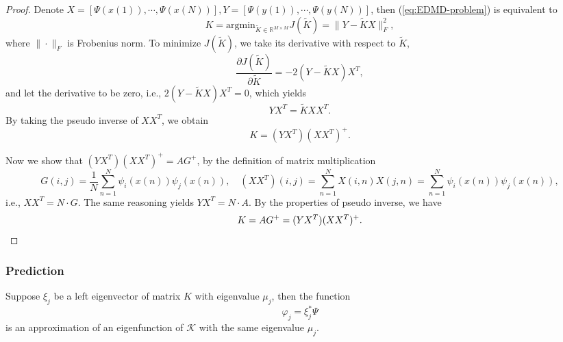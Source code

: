 \documentclass[en, bibend=bibtex]{elegantpaper}
\theoremstyle{plain}
\begin{document}
\begin{proof}
  Denote $X = [\Psi(x(1)),\cdots,\Psi(x(N))], Y =
  [\Psi(y(1)),\cdots,\Psi(y(N))]$,
  then (\ref{eq:EDMD-problem}) is equivalent to
  \begin{equation*}
    K = \text{argmin}_{\tilde{K} \in \mathbb{R}^{M \times M}} J(\tilde{K})
    = \|Y - \tilde{K}X\|_F^2,
  \end{equation*}
  where $\|\cdot\|_F$ is Frobenius norm.
  To minimize $J(\tilde{K})$, we take its derivative with respect to $\tilde{K}$,
  \begin{equation*}
    \frac{\partial J(\tilde{K})}{\partial \tilde{K}}
    = - 2(Y - \tilde{K}X)X^T,
  \end{equation*}
  and let the derivative to be zero, i.e.,
  $2(Y-\tilde{K}X)X^T = 0$,
  which yields
  \begin{equation*}
    YX^T = \tilde{K}XX^T.
  \end{equation*}
  By taking the pseudo inverse of $XX^T$,
  we obtain
  \begin{equation*}
    K = (YX^T)(XX^T)^+.
  \end{equation*}

  Now we show that $(YX^T)(XX^T)^+ = AG^+$,
  by the definition of matrix multiplication
  \begin{equation*}
    G(i,j) = \frac{1}{N} \sum\limits_{n = 1}^N \psi_i(x(n))\psi_j(x(n)), \quad
    (XX^T)(i,j) = \sum\limits_{n = 1}^N X(i,n)X(j,n) = \sum\limits_{n = 1}^N \psi_i(x(n))\psi_j(x(n)),
  \end{equation*}
  i.e., $XX^T = N \cdot G$.
  The same reasoning yields $YX^T = N \cdot A$.
  By the properties of pseudo inverse,
  we have
  \begin{equation*}
    K = AG^+ = (YX^T)(XX^T)^+. \qedhere
  \end{equation*}
\end{proof}

\subsubsection{Prediction}


\begin{proposition}
  Suppose $\xi_j$ be a left eigenvector of matrix $K$ with eigenvalue $\mu_j$,
  then the function
  \begin{equation}
    \label{eq:expression-of-eigenfunction}
    \varphi_j = \xi_j^\ast \Psi
  \end{equation}
  is an approximation of an eigenfunction of $\mathcal{K}$
  with the same eigenvalue $\mu_j$.
\end{proposition}
\end{document}
